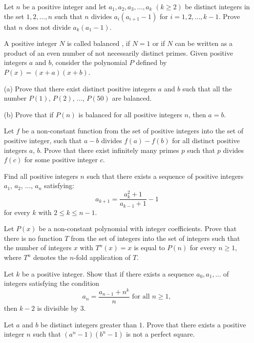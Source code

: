 \item[\textbf{N1.}]
Let 
$ n$
 be a positive integer and let 
$ a_1,a_2,a_3,\ldots,a_k$
$ ( k\ge 2)$
 be distinct integers in the set 
$ { 1,2,\ldots,n}$
 such that 
$ n$
 divides 
$ a_i(a_{i + 1} - 1)$
 for 
$ i = 1,2,\ldots,k - 1$.
 Prove that 
$ n$
 does not divide 
$ a_k(a_1 - 1).$

\item[\textbf{N2.}]
A positive integer 
$N$
 is called 
balanced
, if 
$N=1$
 or if 
$N$
 can be written as a product of an even number of not necessarily distinct primes. Given positive integers 
$a$
 and 
$b$, 
 consider the polynomial 
$P$
 defined by 
$P(x)=(x+a)(x+b)$.

(a) Prove that there exist distinct positive integers 
$a$
 and 
$b$
 such that all the number 
$P(1)$, 
$P(2)$, 
$\ldots$, 
$P(50)$
 are balanced.

(b) Prove that if 
$P(n)$
 is balanced for all positive integers 
$n$, 
 then 
$a=b$.

\item[\textbf{N3.}]
Let 
$f$
 be a non-constant function from the set of positive integers into the set of positive integer, such that 
$a-b$
 divides 
$f(a)-f(b)$
 for all distinct positive integers 
$a$, 
$b$.
 Prove that there exist infinitely many primes 
$p$
 such that 
$p$
 divides 
$f(c)$
 for some positive integer 
$c$.

\item[\textbf{N4.}]
Find all positive integers 
$n$
 such that there exists a sequence of positive integers
$a_1$, 
$a_2$, 
$\ldots$, 
$a_n$
 satisfying: 
\[a_{k+1}=\frac{a_k^2+1}{a_{k-1}+1}-1\]
 for every 
$k$
 with 
$2\leq k\leq n-1$.

\item[\textbf{N5.}]
Let 
$P(x)$
 be a non-constant polynomial with integer coefficients. Prove that there is no function 
$T$
 from the set of integers into the set of integers such that the number of integers 
$x$
 with 
$T^n(x)=x$
 is equal to 
$P(n)$
 for every 
$n\geq 1$, 
 where 
$T^n$
 denotes the 
$n$-fold application of 
$T$.

\item[\textbf{N6.}]
Let 
$k$
 be a positive integer. Show that if there exists a sequence 
$a_0,a_1,\ldots$
 of integers satisfying the condition 
\[a_n=\frac{a_{n-1}+n^k}{n}\text{ for all } n\geq 1,\]
then 
$k-2$
 is divisible by 
$3$.

\item[\textbf{N7.}]
Let 
$a$
 and 
$b$
 be distinct integers greater than 
$1$.
 Prove that there exists a positive integer 
$n$
 such that 
$(a^n-1)(b^n-1)$
 is not a perfect square.
